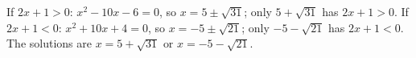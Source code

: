 If $2x+1>0$: $x^2-10x-6=0$, so $x=5\pm\sqrt{31}$; only $5+\sqrt{31}$ has $2x+1>0$. If $2x+1<0$: $x^2+10x+4=0$, so $x=-5\pm\sqrt{21}$; only $-5-\sqrt{21}$ has $2x+1<0$. The solutions are $\boxed{x=5+\sqrt{31}\text{ or }x=-5-\sqrt{21}}$.
